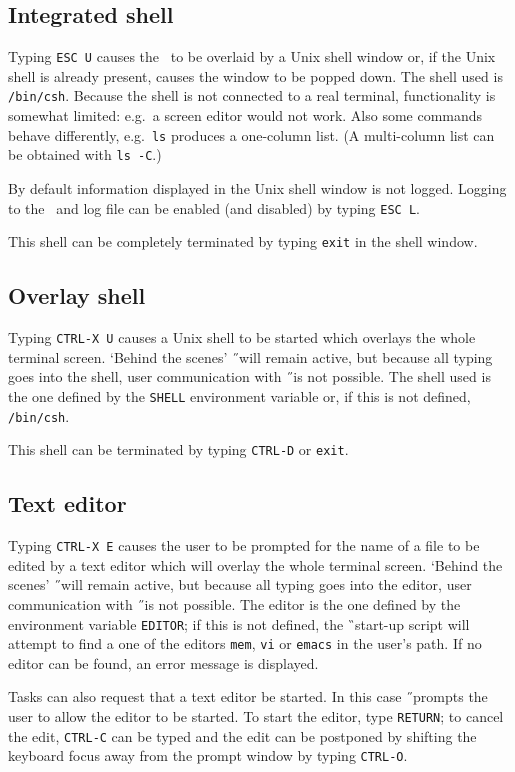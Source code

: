 \subsection*{Integrated shell}
Typing {\tt ESC U}\label{escu} causes the \COA\ to be overlaid by a Unix
shell window or,
if the Unix shell is already present, causes the window to be popped down.
The shell used is {\tt /bin/csh}.
Because the shell is not connected to
a real terminal, functionality is somewhat limited: e.g.\ a screen editor
would not work.
Also some commands behave differently, e.g.\ {\tt ls} produces a one-column
list. (A multi-column list can be obtained with {\tt ls -C}.)

By default information displayed in the Unix shell window is not logged.
Logging to the \COA\ and log file can be enabled (and disabled) by typing
{\tt ESC L}.\label{escl}

This shell can be completely terminated by typing {\tt exit} in the shell
window.
\subsection*{Overlay shell}
Typing {\tt CTRL-X U}\label{ctrlxu} causes a Unix shell to be started which
overlays the whole terminal screen.
`Behind the scenes' \H\ will remain active, but because all typing goes into
the shell, user communication with \H\ is not possible.
The shell used is the one defined by the {\tt SHELL} environment variable or,
if this is not defined, {\tt /bin/csh}.

This shell can be terminated by typing {\tt CTRL-D} or {\tt exit}.
\subsection*{Text editor}
Typing {\tt CTRL-X E}\label{ctrlxe} causes the user to be prompted for the name
of a file to be edited by a text editor which will overlay the whole terminal
screen.
`Behind the scenes' \H\ will remain active, but because all typing goes into
the editor, user communication with \H\ is not possible.
The editor is the one defined
by the environment variable {\tt EDITOR};
if this is not defined, the \G\ start-up script will attempt to find a
one of the editors {\tt mem}, {\tt vi} or {\tt emacs} in the user's path.
If no editor can be found, an error message is displayed.

Tasks can also request that a text editor be started. In this case \H\ prompts
the user to allow the editor to be started. To start the editor,
type {\tt RETURN}; to cancel the edit, {\tt CTRL-C} can be typed and the
edit can be postponed by shifting the keyboard focus away from the prompt
window by typing {\tt CTRL-O}.

